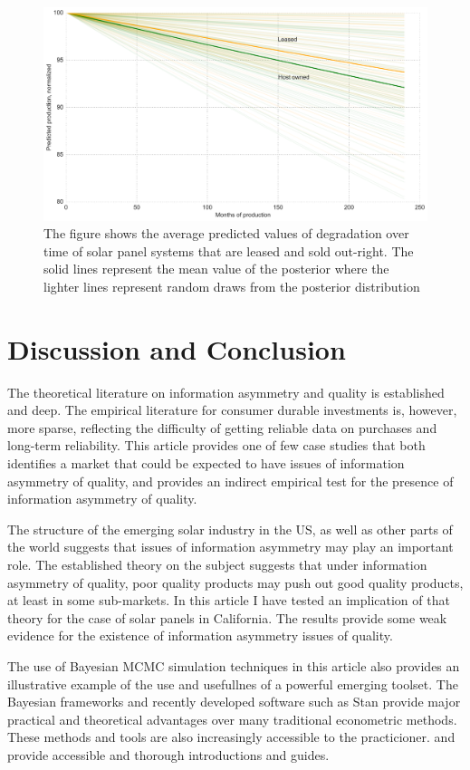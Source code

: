 \documentclass[12pt]{article}
\begin{document}
\begin{figure}
	\includegraphics[width=1\textwidth]{figures/predicted_deg.png}
	\caption{The figure shows the average predicted values of degradation over time of solar panel systems that are leased and sold out-right. The solid lines represent the mean value of the posterior where the lighter lines represent random draws from the posterior distribution}
	\label{predicted_deg}
\end{figure}

\section{Discussion and Conclusion}
The theoretical literature on information asymmetry and quality is established and deep. The empirical literature for consumer durable investments is, however, more sparse, reflecting the difficulty of getting reliable data on purchases and long-term reliability. This article provides one of few case studies that both identifies a market that could be expected to have issues of information asymmetry of quality, and provides an indirect empirical test for the presence of information asymmetry of quality.

The structure of the emerging solar industry in the US, as well as other parts of the world suggests that issues of information asymmetry may play an important role. The established theory on the subject suggests that under information asymmetry of quality, poor quality products may push out good quality products, at least in some sub-markets. In this article I have tested an implication of that theory for the case of solar panels in California. The results provide some weak evidence for the existence of information asymmetry issues of quality.

The use of Bayesian MCMC simulation techniques in this article also provides an illustrative example of the use and usefullnes of a powerful emerging toolset. The Bayesian frameworks and recently developed software such as Stan provide major practical and theoretical advantages over many traditional econometric methods. These methods and tools are also increasingly accessible to the practicioner. \citet{kruschke_doing_2014} and \citet{stan_development_team_stan_2014} provide accessible and thorough introductions and guides.
\end{document}
